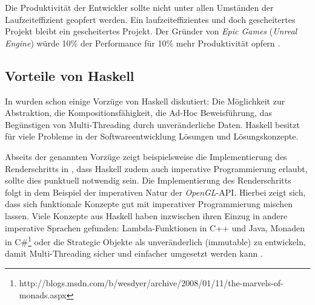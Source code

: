 
Die Produktivität der Entwickler sollte nicht unter allen Umständen der Laufzeiteffizient geopfert werden. Ein laufzeiteffizientes und doch gescheitertes Projekt bleibt ein gescheitertes Projekt. Der Gründer von \textit{Epic Games} (\textit{Unreal Engine}) würde 10\% der Performance für 10\% mehr Produktivität opfern \parencite[Seite 20]{Sweeney2006}.



\subsection{Vorteile von Haskell}

In  wurden schon einige Vorzüge von Haskell diskutiert: Die Möglichkeit zur Abstraktion, die Kompositionsfähigkeit, die Ad-Hoc Beweisführung, das Begünstigen von Multi-Threading durch unveränderliche Daten. Haskell besitzt für viele Probleme in der Softwareentwicklung Lösungen und Lösungskonzepte. 

Abseits der genannten Vorzüge zeigt beispielsweise die Implementierung des Renderschritts in , dass Haskell zudem auch imperative Programmierung erlaubt, sollte dies punktuell notwendig sein. Die Implementierung des Renderschritts folgt in dem Beispiel der imperativen Natur der \textit{OpenGL}-\ac{API}. Hierbei zeigt sich, dass sich funktionale Konzepte gut mit imperativer Programmierung mischen lassen. Viele Konzepte aus Haskell haben inzwischen ihren Einzug in andere imperative Sprachen gefunden: Lambda-Funktionen in C++ und Java, Monaden in C\#\footnote{http://blogs.msdn.com/b/wesdyer/archive/2008/01/11/the-marvels-of-monads.aspx} oder die Strategie Objekte als unveränderlich (immutable) zu entwickeln, damit Multi-Threading sicher und einfacher umgesetzt werden kann \parencite[Seite 46ff]{Peierls:2005:JCP:1076522}.

